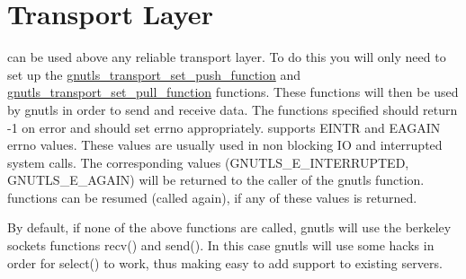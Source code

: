 \section{Transport Layer}
\par
\gnutls can be used above any reliable transport layer. To do this you will only 
need to set up the 
\hyperref{gnutls\_transport\_set\_push\_function()}{gnutls\_transport\_set\_push\_function() (see Section }{)}{gnutls_transport_set_push_function} and
\hyperref{gnutls\_transport\_set\_pull\_function()}{gnutls\_transport\_set\_pull\_function() (see Section }{)}{gnutls_transport_set_pull_function}
functions. These functions will then be used by gnutls in order to send and receive data.
The functions specified should return -1 on error and should set errno appropriately.
\gnutls supports EINTR and EAGAIN errno values. These values are
usually used in non blocking IO and interrupted system calls.
The corresponding values (GNUTLS\_E\_INTERRUPTED, GNUTLS\_E\_AGAIN) 
will be returned to the caller of the gnutls function. \gnutls functions
can be resumed (called again), if any of these values is returned.
\par
By default, if none of the above functions are called, gnutls will use
the berkeley sockets functions recv() and send(). In this case
gnutls will use some hacks in order for select() to work, thus
making easy to add \tls support to existing servers.


